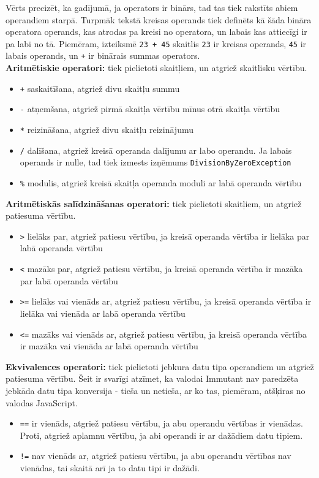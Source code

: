 \documentclass[12pt,a4paper]{report}
\begin{document}
Vērts precizēt, ka gadījumā, ja operators ir binārs, tad tas tiek rakstīts abiem operandiem starpā. Turpmāk tekstā kreisas operands tiek definēts kā šāda bināra operatora operands, kas atrodas pa kreisi no operatora, un labais kas attiecīgi ir pa labi no tā. Piemēram, izteiksmē \texttt{23 + 45} skaitlis \texttt{23} ir kreisas operands, \texttt{45} ir labais operands, un \texttt{+} ir binārais summas operators. \\

\textbf{Aritmētiskie operatori:} tiek pielietoti skaitļiem, un atgriež skaitlisku vērtību.

\begin{itemize}
  \item \texttt{+} saskaitīšana, atgriež divu skaitļu summu
  \item \texttt{-} atņemšana, atgriež pirmā skaitļa vērtību mīnus otrā skaitļa vērtību
  \item \texttt{*} reizināšana, atgriež divu skaitļu reizinājumu
  \item \texttt{/} dalīšana, atgriež kreisā operanda dalījumu ar labo operandu. Ja labais operands ir nulle, tad tiek izmests izņēmums \texttt{DivisionByZeroException}
  \item \texttt{\%} modulis, atgriež kreisā skaitļa operanda moduli ar labā operanda vērtību
\end{itemize}

\textbf{Aritmētiskās salīdzināšanas operatori:} tiek pielietoti skaitļiem, un atgriež patiesuma vērtību. 
\begin{itemize}
  \item \texttt{>} lielāks par, atgriež patiesu vērtību, ja kreisā operanda vērtība ir lielāka par labā operanda vērtību
  \item \texttt{<} mazāks par, atgriež patiesu vērtību, ja kreisā operanda vērtība ir mazāka par labā operanda vērtību
  \item \texttt{>=} lielāks vai vienāds ar, atgriež patiesu vērtību, ja kreisā operanda vērtība ir lielāka vai vienāda ar labā operanda vērtību
  \item \texttt{<=} mazāks vai vienāds ar, atgriež patiesu vērtību, ja kreisā operanda vērtība ir mazāka vai vienāda ar labā operanda vērtību
\end{itemize}

\textbf{Ekvivalences operatori:} tiek pielietoti jebkura datu tipa operandiem un atgriež patiesuma vērtību. Šeit ir svarīgi atzīmet, ka valodai Immutant nav paredzēta jebkāda datu tipa konversija - tieša un netieša, ar ko tas, piemēram, atšķiras no valodas JavaScript\cite{ecma-262}. 
\begin{itemize}
  \item \texttt{==} ir vienāds, atgriež patiesu vērtību, ja abu operandu vērtības ir vienādas. Proti, atgriež aplamnu vērtību, ja abi operandi ir ar dažādiem datu tipiem.
  \item \texttt{!=} nav vienāds ar, atgriež patiesu vērtību, ja abu operandu vērtības nav vienādas, tai skaitā arī ja to datu tipi ir dažādi.
\end{itemize}
\end{document}
